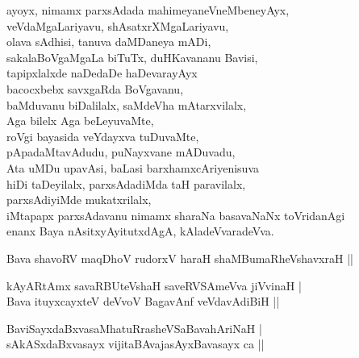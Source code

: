\begin{entry}
\begin{shl}
ayoyx, nimamx parxsAdada mahimeyaneVneMbeneyAyx,\\
veVdaMgaLariyavu, shAsatxrXMgaLariyavu,\\
olava sAdhisi, tanuva daMDaneya mADi,\\
sakalaBoVgaMgaLa biTuTx, duHKavananu Bavisi,\\
tapipxlalxde naDedaDe haDevarayAyx\\
bacocxbebx savxgaRda BoVgavanu,\\
baMduvanu biDalilalx, saMdeVha mAtarxvilalx,\\
Aga bilelx Aga beLeyuvaMte,\\
roVgi bayasida veYdayxva tuDuvaMte,\\
pApadaMtavAdudu, puNayxvane mADuvadu,\\
Ata uMDu upavAsi, baLasi barxhamxcAriyenisuva\\
hiDi taDeyilalx, parxsAdadiMda taH paravilalx,\\
parxsAdiyiMde mukatxrilalx,\\
iMtapapx parxsAdavanu nimamx sharaNa basavaNaNx toVridanAgi\\
enanx Baya nAsitxyAyitutxdAgA, kAladeVvaradeVva.
\end{shl}
\end{entry}

\begin{entry}
\begin{shl}
Bava shavoRV maqDhoV rudorxV haraH shaMBumaRheVshavxraH ||
\end{shl}
\begin{shl}
kAyARtAmx savaRBUteVshaH saveRVSAmeVva jiVvinaH |\\
Bava ituyxcayxteV deVvoV BagavAnf veVdavAdiBiH ||
\end{shl}
\begin{shl}
BaviSayxdaBxvasaMhatuRrasheVSaBavahAriNaH |\\
sAkASxdaBxvasayx vijitaBAvajasAyxBavasayx ca ||
\end{shl}

\end{entry}

